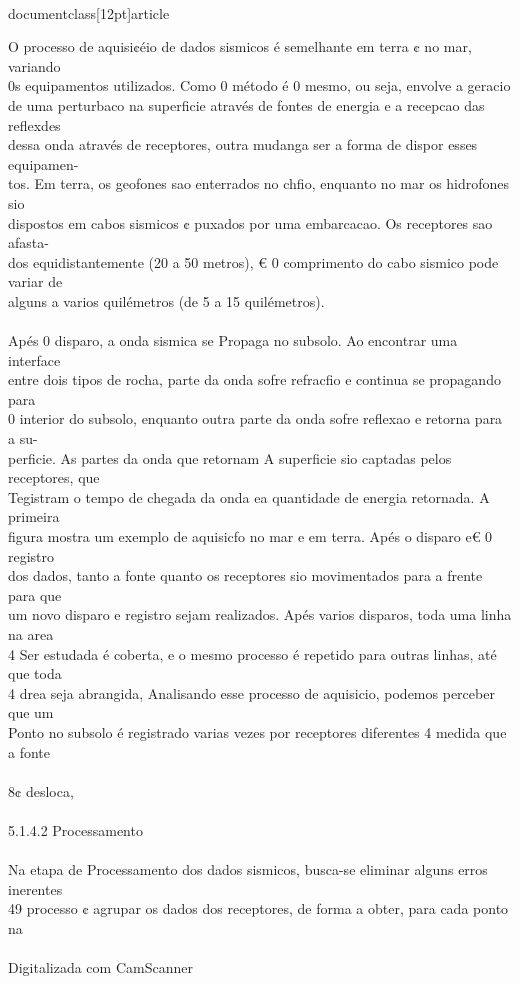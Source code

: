 \\documentclass[12pt]{article}
\begin{document}
O processo de aquisi¢éio de dados sismicos é semelhante em terra ¢ no mar, variando\\
0s equipamentos utilizados. Como 0 método é 0 mesmo, ou seja, envolve a geracio\\
de uma perturbaco na superficie através de fontes de energia e a recepcao das reflexdes\\
dessa onda através de receptores, outra mudanga ser a forma de dispor esses equipamen-\\
tos. Em terra, os geofones sao enterrados no chfio, enquanto no mar os hidrofones sio\\
dispostos em cabos sismicos ¢ puxados por uma embarcacao. Os receptores sao afasta-\\
dos equidistantemente (20 a 50 metros), € 0 comprimento do cabo sismico pode variar de\\
alguns a varios quilémetros (de 5 a 15 quilémetros).\\
\\
Apés 0 disparo, a onda sismica se Propaga no subsolo. Ao encontrar uma interface\\
entre dois tipos de rocha, parte da onda sofre refracfio e continua se propagando para\\
0 interior do subsolo, enquanto outra parte da onda sofre reflexao e retorna para a su-\\
perficie. As partes da onda que retornam A superficie sio captadas pelos receptores, que\\
Tegistram o tempo de chegada da onda ea quantidade de energia retornada. A primeira\\
figura mostra um exemplo de aquisicfo no mar e em terra. Apés o disparo e€ 0 registro\\
dos dados, tanto a fonte quanto os receptores sio movimentados para a frente para que\\
um novo disparo e registro sejam realizados. Apés varios disparos, toda uma linha na area\\
4 Ser estudada é coberta, e o mesmo processo é repetido para outras linhas, até que toda\\
4 drea seja abrangida, Analisando esse processo de aquisicio, podemos perceber que um\\
Ponto no subsolo é registrado varias vezes por receptores diferentes 4 medida que a fonte\\
\\
8¢ desloca,\\
\\
5.1.4.2 Processamento\\
\\
Na etapa de Processamento dos dados sismicos, busca-se eliminar alguns erros inerentes\\
49 processo ¢ agrupar os dados dos receptores, de forma a obter, para cada ponto na\\
\\
Digitalizada com CamScanner\\
\end{document}
